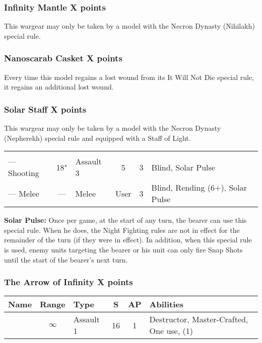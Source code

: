 \subsubsection[Infinity Mantle]{Infinity Mantle \dotfill X points}
This wargear may only be taken by a model with the Necron Dynasty (Nihilakh) special rule.

\subsubsection[Nanoscarab Casket]{Nanoscarab Casket \dotfill X points}

Every time this model regains a lost wound from its It Will Not Die special rule, it regains an additional lost wound.

\subsubsection[Solar Staff]{Solar Staff \dotfill X points}
This wargear may only be taken by a model with the Necron Dynasty (Nepherekh) special rule and equipped with a Staff of Light.

\label{Solar Staff}
\noindent
\begin{NiceTabular}{L{115 pt} c C{40pt} *{2}{c} >{\raggedright\arraybackslash}p{240pt}}
 & & &  &  &  \\
— Shooting & 18" & Assault 3 & 5 & 3 & Blind, Solar Pulse \\
— Melee & — & Melee & User & 3 & Blind, Rending (6+), Solar Pulse \\
\end{NiceTabular}

\textbf{Solar Pulse:} Once per game, at the start of any turn, the bearer can use this special rule. When he does, the Night Fighting rules are not in effect for the remainder of the turn (if they were in effect). In addition, when this special rule is used, enemy units targeting the bearer or his unit can only fire Snap Shots until the start of the bearer’s next turn.

\subsubsection[The Arrow of Infinity]{The Arrow of Infinity \dotfill X points}

\label{The Arrow of Infinity Arrow}
\noindent
\begin{NiceTabular}{L{115 pt} c C{40pt} *{2}{c} >{\raggedright\arraybackslash}p{240pt}}
	Name & Range & Type & S & AP & Abilities \\
	\hline
	  & $\infty$ & Assault 1 & 16 & 1 & Destructor, Master-Crafted, One use,  (1) \\
\end{NiceTabular}

